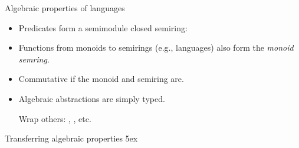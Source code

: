 \documentclass[aspectratio=169]{beamer}
\begin{document}
\begin{frame}{Algebraic properties of languages}
\begin{itemize}\itemsep4ex
\item Predicates form a semimodule closed semiring:
\item Functions from monoids to semirings (e.g., languages) also form the \emph{monoid semring}.
\item Commutative if the monoid and semiring are.
\item Algebraic abstractions are simply typed.

      Wrap others: { }, { }, etc.
\end{itemize}
\end{frame}

\rnc{}

\begin{frame}{Transferring algebraic properties}
\vspace{3ex}
\AgdaEmptySkip5ex
\end{frame}
\end{document}

